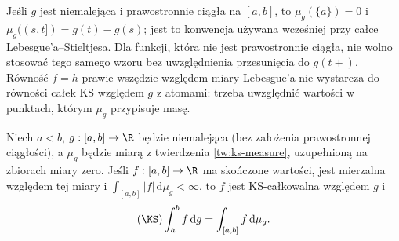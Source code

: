 \begin{uwaga}
Jeśli $g$ jest niemalejąca i prawostronnie ciągła na $[a,b]$, to $\mu_g(\{a\})=0$ i $\mu_g((s,t])=g(t)-g(s)$; jest to konwencja używana wcześniej przy całce Lebesgue'a--Stieltjesa. Dla funkcji, która nie jest prawostronnie ciągła, nie wolno stosować tego samego wzoru bez uwzględnienia przesunięcia do $g(t+)$. Równość $f=h$ prawie wszędzie względem miary Lebesgue'a nie wystarcza do równości całek KS względem $g$ z atomami: trzeba uwzględnić wartości w punktach, którym $\mu_g$ przypisuje masę.
\end{uwaga}

\begin{twierdzenie}\label{ma1:kh:thm:ks-positive-measure-l1}
Niech $a<b$, $g:[a,b]\to\R$ będzie niemalejąca (bez założenia prawostronnej ciągłości), a $\mu_g$ będzie miarą z twierdzenia \ref{tw:ks-measure}, uzupełnioną na zbiorach miary zero. Jeśli $f:[a,b]\to\R$ ma skończone wartości, jest mierzalna względem tej miary i $\int_{[a,b]}|f|\,\mathrm d\mu_g<\infty$, to $f$ jest KS-całkowalna względem $g$ i
\[
 (\KS)\int_a^b f\,\mathrm dg=\int_{[a,b]} f\,\mathrm d\mu_g.
\]
\end{twierdzenie}
